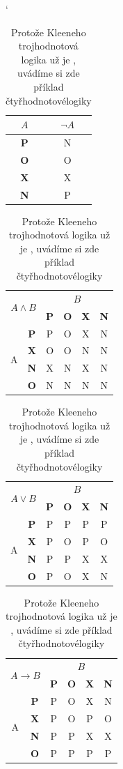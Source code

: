 \documentclass[11pt, a4paper]{article}
\begin{document}
\begin{table}[h] \catcode`
	\begin{center}
		\begin{tabular}{|c|c|} \hline
		$A$ & $\neg A$ \\ \hline
		\textbf{P} & N \\ \hline
		\textbf{O} & O \\ \hline
		\textbf{X} & X \\ \hline
		\textbf{N} & P \\ \hline
		\end{tabular}
		\begin{tabular}{|c|c|c|c|c|c|} \hline
		\multicolumn{2}{|c|}{\multirow{2}{*}{$A \wedge B$}} & 		 	\multicolumn{4}{|c|}{$B$}  \\ \cline{3-6} 
		\multicolumn{2}{|c|}{} & \textbf{P} & \textbf{O} & \textbf{X} & \textbf{N}  \\ \hline
		\multirow{4}{*}{A} & \textbf{P} & P  & O & X & N  \\ \cline{2-6} 
		& \textbf{X}  & O & O & N & N \\ \cline{2-6} 
		& \textbf{N}  & X & N & X & N \\ \cline{2-6} 
		& \textbf{O}  & N & N & N & N \\ \hline
		\end{tabular}
		\begin{tabular}{|c|c|c|c|c|c|} \hline
		\multicolumn{2}{|c|}{\multirow{2}{*}{$A \vee B$}} & 		 	\multicolumn{4}{|c|}{$B$}  \\ \cline{3-6} 
		\multicolumn{2}{|c|}{} & \textbf{P} & \textbf{O} & \textbf{X} & \textbf{N}  \\ \hline
		\multirow{4}{*}{A} & \textbf{P} & P  & P & P & P  \\ \cline{2-6} 
		& \textbf{X}  & P & O & P & O \\ \cline{2-6} 
		& \textbf{N}  & P & P & X & X \\ \cline{2-6} 
		& \textbf{O}  & P & O & X & N \\ \hline
		\end{tabular}
		\begin{tabular}{|c|c|c|c|c|c|} \hline
		\multicolumn{2}{|c|}{\multirow{2}{*}{$A \rightarrow B$}} & 		 	\multicolumn{4}{|c|}{$B$}  \\ \cline{3-6} 
		\multicolumn{2}{|c|}{} & \textbf{P} & \textbf{O} & \textbf{X} & \textbf{N}  \\ \hline
		\multirow{4}{*}{A} & \textbf{P} & P  & O & X & N  \\ \cline{2-6} 
		& \textbf{X}  & P & O & P & O \\ \cline{2-6} 
		& \textbf{N}  & P & P & X & X \\ \cline{2-6} 
		& \textbf{O}  & P & P & P & P \\ \hline
		\end{tabular}
		\caption{Protože Kleeneho trojhodnotová logika už je
, uvádíme si zde příklad čtyřhodnotové\label{tab:tab2}
logiky}
	\end{center}
\end{table}
\end{document}
